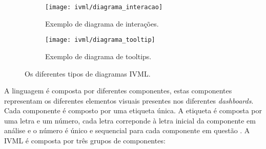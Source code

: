 \begin{figure}[htbp]
  \centering
  \begin{subfigure}[b]{0.45\textwidth}
    \texttt{[image: ivml/diagrama\_interacao]}
    \caption{Exemplo de diagrama de interações.}
    \label{fig:interacao}
  \end{subfigure}
  \hfill
  \begin{subfigure}[b]{0.45\textwidth}
    \texttt{[image: ivml/diagrama\_tooltip]}
    \caption{Exemplo de diagrama de tooltips.}
    \label{fig:tooltip}
  \end{subfigure}
  \caption{Os diferentes tipos de diagramas IVML.}
  \label{fig:diagramas_ivml}
\end{figure}

A linguagem é composta por diferentes componentes, estas componentes representam os diferentes elementos visuais presentes nos diferentes \textit{dashboards}. Cada componente é composto por uma etiqueta única. A etiqueta é composta por uma letra e um número, cada letra correponde à letra inicial da componente em análise e o número é único e sequencial para cada componente em questão \cite{Ferreira2023IVML}. A \gls{IVML} é composta por três grupos de componentes: 

